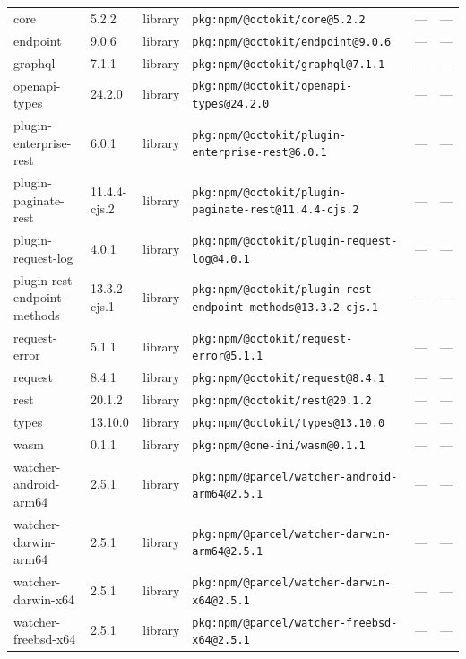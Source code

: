 \documentclass[11pt,a4paper]{article}
\begin{document}
\begin{longtable}{|p{4cm}|p{2cm}|p{1.6cm}|p{5cm}|p{1.5cm}|p{3.5cm}|}
\raggedright core & 5.2.2 & library & \small\texttt{pkg:npm/@octokit/core@5.2.2} & — & \small — \\
\raggedright endpoint & 9.0.6 & library & \small\texttt{pkg:npm/@octokit/endpoint@9.0.6} & — & \small — \\
\raggedright graphql & 7.1.1 & library & \small\texttt{pkg:npm/@octokit/graphql@7.1.1} & — & \small — \\
\raggedright openapi-types & 24.2.0 & library & \small\texttt{pkg:npm/@octokit/openapi-types@24.2.0} & — & \small — \\
\raggedright plugin-enterprise-rest & 6.0.1 & library & \small\texttt{pkg:npm/@octokit/plugin-enterprise-rest@6.0.1} & — & \small — \\
\raggedright plugin-paginate-rest & 11.4.4-cjs.2 & library & \small\texttt{pkg:npm/@octokit/plugin-paginate-rest@11.4.4-cjs.2} & — & \small — \\
\raggedright plugin-request-log & 4.0.1 & library & \small\texttt{pkg:npm/@octokit/plugin-request-log@4.0.1} & — & \small — \\
\raggedright plugin-rest-endpoint-methods & 13.3.2-cjs.1 & library & \small\texttt{pkg:npm/@octokit/plugin-rest-endpoint-methods@13.3.2-cjs.1} & — & \small — \\
\raggedright request-error & 5.1.1 & library & \small\texttt{pkg:npm/@octokit/request-error@5.1.1} & — & \small — \\
\raggedright request & 8.4.1 & library & \small\texttt{pkg:npm/@octokit/request@8.4.1} & — & \small — \\
\raggedright rest & 20.1.2 & library & \small\texttt{pkg:npm/@octokit/rest@20.1.2} & — & \small — \\
\raggedright types & 13.10.0 & library & \small\texttt{pkg:npm/@octokit/types@13.10.0} & — & \small — \\
\raggedright wasm & 0.1.1 & library & \small\texttt{pkg:npm/@one-ini/wasm@0.1.1} & — & \small — \\
\raggedright watcher-android-arm64 & 2.5.1 & library & \small\texttt{pkg:npm/@parcel/watcher-android-arm64@2.5.1} & — & \small — \\
\raggedright watcher-darwin-arm64 & 2.5.1 & library & \small\texttt{pkg:npm/@parcel/watcher-darwin-arm64@2.5.1} & — & \small — \\
\raggedright watcher-darwin-x64 & 2.5.1 & library & \small\texttt{pkg:npm/@parcel/watcher-darwin-x64@2.5.1} & — & \small — \\
\raggedright watcher-freebsd-x64 & 2.5.1 & library & \small\texttt{pkg:npm/@parcel/watcher-freebsd-x64@2.5.1} & — & \small — \\

\end{longtable}
\end{document}
